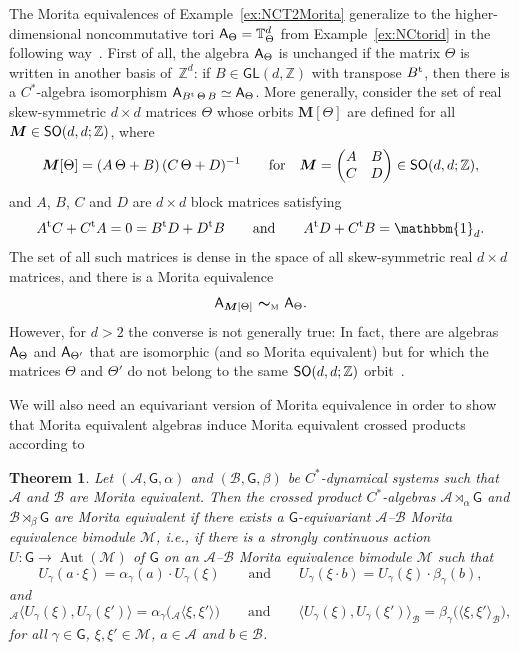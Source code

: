 \documentclass[pdftex]{sigma}
\numberwithin{equation}{section}
\newcommand{\Z}{\zed}
\newcommand{\mbf}[1]{{\boldsymbol {#1} }}
\def\A{{\sf A}}
\newcommand{\unit}{\mathbbm{1}} 			%
\newcommand{\sfG}{\mathsf{G}}
\newcommand{\sfGL}{\mathsf{GL}}
\newcommand{\Aut}{\operatorname{Aut}}
\newcommand{\zed}{{\mathbb Z}} %
\newcommand{\torus}{{\mathbb T}} %
\def\alg{{\mathcal A}}
\def\balg{{\mathcal B}}
\def\Mcal{{\mathcal M}}
\newtheorem{Theorem}{Theorem}[section]
\begin{document}
\begin{Example}
\label{ex:NCTdMorita}
The Morita equivalences of Example~\ref{ex:NCT2Morita} generalize to
the higher-dimensional noncommutative tori $\A_\Theta=\torus^d_\Theta$
from Example~\ref{ex:NCtorid} in the following
way~\cite{Rieffel1998}. First of all, the algebra $\A_\Theta$ is
unchanged if the matrix $\Theta$ is written in another basis of~$\Z^d$: if $B\in\sfGL(d,\Z)$ with transpose $B^{\rm t}$, then there is
a $C^*$-algebra isomorphism
$\A_{B^{\rm t}\,\Theta\,B}\simeq\A_\Theta$. More generally, consider the set of real
skew-symmetric $d{\times}d$ matrices $\Theta$ whose orbits
$\mbf M[\Theta]$ are defined for all $\mbf M\in{\sf SO}(d,d;\Z)$, where
\[
\mbf M[\Theta] = (A\,\Theta+B)\,(C\,\Theta+D)^{-1} \qquad \mbox{for} \quad
\mbf M=\left(\begin{matrix} A & B \\ C & D \end{matrix}\right) \in
{\sf SO}(d,d;\Z) ,
\]
and $A$, $B$, $C$ and $D$ are $d{\times}d$ block matrices satisfying
\[
A^{\rm t} C+C^{\rm t} A = 0 = B^{\rm t} D+D^{\rm t} B \qquad
\mbox{and} \qquad A^{\rm t} D+C^{\rm t} B=\unit_d .
\]
The set of all such matrices is dense in the space of all
skew-symmetric real $d{\times}d$ matrices, and there is a Morita
equivalence
\[
\A_{\mbf M[\Theta]} \ \mbf\sim_{\text{\tiny M}} \ \A_\Theta .
\]
However, for $d>2$ the converse is not generally true: In fact, there
are algebras $\A_\Theta$ and $\A_{\Theta'}$ that are isomorphic (and
so Morita equivalent) but for which the matrices $\Theta$ and
$\Theta'$ do not belong to the same ${\sf SO}(d,d;\Z)$
orbit~\cite{Rieffel1998}.
\end{Example}

We will also need an equivariant version of Morita equivalence in
order to show that Morita equivalent algebras induce Morita
equivalent crossed products according
to~\cite[Section~5.4]{Echterhoff2017}
\begin{Theorem}\label{equivMorita}
Let $(\alg,\sfG, \alpha)$ and $(\balg,\sfG, \beta)$ be
$C^*$-dynamical systems such that
$\alg$ and $\balg$ are Morita equivalent. Then the crossed product $C^*$-algebras
$\alg\rtimes_\alpha \sfG$ and $\balg\rtimes_\beta \sfG$ are Morita equivalent if
there exists a $\sfG$-equivariant $\alg$--$\balg$ Morita equivalence bimodule $\Mcal$,
i.e., if there is a strongly continuous action $U\colon \sfG\to \Aut(\Mcal)$ of $\sfG$ on an
$\alg$--$\balg$ Morita equivalence bimodule $\Mcal$ such that
\[
U_\gamma(a\cdot \xi)=\alpha_\gamma(a)\cdot
U_\gamma(\xi) \qquad \mbox{and} \qquad U_\gamma(\xi\cdot b)=U_\gamma(\xi)\cdot
\beta_\gamma(b) ,
\]
and
\[
{}_{\alg}\langle U_\gamma(\xi),U_\gamma(\xi')\rangle=\alpha_\gamma\big({}_\alg\langle
\xi,\xi'\rangle\big) \qquad \mbox{and} \qquad \langle
U_\gamma(\xi),U_\gamma(\xi')\rangle_\balg =\beta_\gamma\big(\langle
\xi,\xi'\rangle_\balg\big) ,
\]
for
all $\gamma\in \sfG$, $\xi,\xi'\in \Mcal$, $a\in \alg$ and $b\in \balg$.
\end{Theorem}
\end{document}
